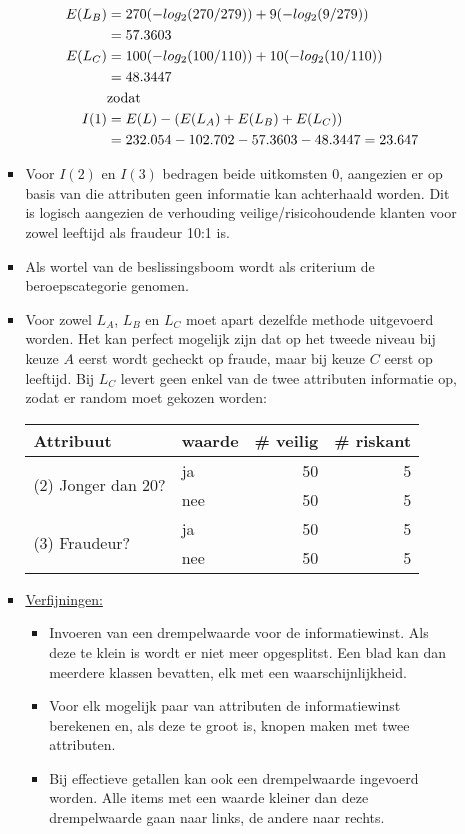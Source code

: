 \begin{itemize}
\begin{itemize}
\begin{itemize}
\begin{equation*}
\begin{split}
							     E(L_B) & = 270(-log_2(270/279)) + 9(-log_2(9/279))\\
							     		&  = 57.3603 \\
							     E(L_C) & = 100(-log_2(100/110)) + 10(-log_2(10/110)) \\
									     & = 48.3447\\ 
									     & \hbox{zodat} \\
							I(1) & =  E(L) - (E(L_A) + E(L_B) + E(L_C)) \\
							 	 & = 232.054 - 102.702 - 57.3603 - 48.3447 = 23.647							         	     
						\end{split}
					\end{equation*}
					\item Voor $I(2)$ en $I(3)$ bedragen beide uitkomsten $0$, aangezien er op basis van die attributen geen informatie kan achterhaald worden. Dit is logisch aangezien de verhouding veilige/risicohoudende klanten voor zowel leeftijd als fraudeur 10:1 is.
					\item Als wortel van de beslissingsboom wordt als criterium de beroepscategorie genomen.
					\item Voor zowel $L_A$, $L_B$ en $L_C$ moet apart dezelfde methode uitgevoerd worden. Het kan perfect mogelijk zijn dat op het tweede niveau bij keuze $A$ eerst wordt gecheckt op fraude, maar bij keuze $C$ eerst op leeftijd. 
					\alert Bij $L_C$ levert geen enkel van de twee attributen informatie op, zodat er random moet gekozen worden:
					\begin{table}[ht]
						\centering
						\begin{tabular}{|l | l |rr|}
							\hline	
							Attribuut & waarde & \# veilig & \# riskant \\
							\hline	
							\multirow{2}{*}{(2) Jonger dan 20?} & ja & 50 & 5 \\
							& nee & 50 & 5 \\
							\hline	
							\multirow{2}{*}{(3) Fraudeur?} & ja & 50 & 5 \\
							& nee & 50 & 5 \\
							\hline			
						\end{tabular}
					\end{table}
					\item \underline{Verfijningen:}
					\begin{itemize}
						\item Invoeren van een drempelwaarde voor de informatiewinst. Als deze te klein is wordt er niet meer opgesplitst. Een blad kan dan meerdere klassen bevatten, elk met een waarschijnlijkheid.
						\item Voor elk mogelijk paar van attributen de informatiewinst berekenen en, als deze te groot is, knopen maken met twee attributen.
						\item Bij effectieve getallen kan ook een drempelwaarde ingevoerd worden. Alle items met een waarde kleiner dan deze drempelwaarde gaan naar links, de andere naar rechts.
					\end{itemize}
				\end{itemize}
			\end{itemize}
			

\end{itemize}
